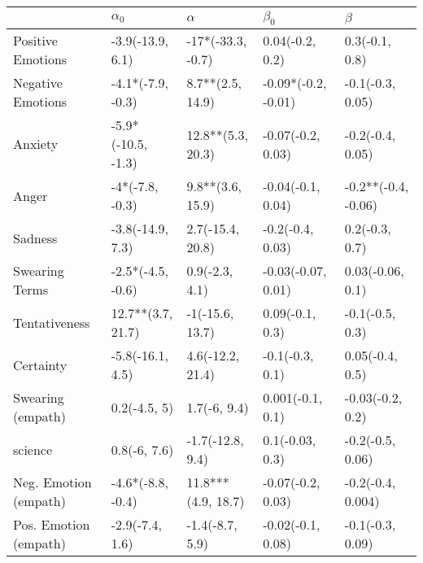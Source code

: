 \begin{tabular}{lllll}
\toprule
{} &          $\alpha_0$ &            $\alpha$ &            $\beta_0$ &              $\beta$ \\
\midrule
Positive Emotions     &    -3.9(-13.9, 6.1) &   -17*(-33.3, -0.7) &      0.04(-0.2, 0.2) &       0.3(-0.1, 0.8) \\
Negative Emotions     &   -4.1*(-7.9, -0.3) &    8.7**(2.5, 14.9) &  -0.09*(-0.2, -0.01) &     -0.1(-0.3, 0.05) \\
Anxiety               &  -5.9*(-10.5, -1.3) &   12.8**(5.3, 20.3) &    -0.07(-0.2, 0.03) &     -0.2(-0.4, 0.05) \\
Anger                 &     -4*(-7.8, -0.3) &    9.8**(3.6, 15.9) &    -0.04(-0.1, 0.04) &  -0.2**(-0.4, -0.06) \\
Sadness               &    -3.8(-14.9, 7.3) &    2.7(-15.4, 20.8) &     -0.2(-0.4, 0.03) &       0.2(-0.3, 0.7) \\
Swearing Terms        &   -2.5*(-4.5, -0.6) &      0.9(-2.3, 4.1) &   -0.03(-0.07, 0.01) &     0.03(-0.06, 0.1) \\
Tentativeness         &   12.7**(3.7, 21.7) &     -1(-15.6, 13.7) &      0.09(-0.1, 0.3) &      -0.1(-0.5, 0.3) \\
Certainty             &    -5.8(-16.1, 4.5) &    4.6(-12.2, 21.4) &      -0.1(-0.3, 0.1) &      0.05(-0.4, 0.5) \\
Swearing (empath)     &        0.2(-4.5, 5) &        1.7(-6, 9.4) &     0.001(-0.1, 0.1) &     -0.03(-0.2, 0.2) \\
science               &        0.8(-6, 7.6) &    -1.7(-12.8, 9.4) &      0.1(-0.03, 0.3) &     -0.2(-0.5, 0.06) \\
Neg. Emotion (empath) &   -4.6*(-8.8, -0.4) &  11.8***(4.9, 18.7) &    -0.07(-0.2, 0.03) &    -0.2(-0.4, 0.004) \\
Pos. Emotion (empath) &     -2.9(-7.4, 1.6) &     -1.4(-8.7, 5.9) &    -0.02(-0.1, 0.08) &     -0.1(-0.3, 0.09) \\
\bottomrule
\end{tabular}
